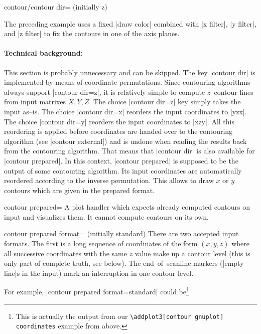 {{\begin{pgfplotskey}{contour/contour dir= (initially z)}
\begin{codeexample}[]
\begin{tikzpicture}
\begin{axis}[
	xlabel=$x$,ylabel=$y$,
	enlargelimits=false,
	3d box=complete]
\end{axis}
\end{tikzpicture}
\end{codeexample}
	\noindent The preceding example uses a fixed |draw color| combined with |x filter|, |y filter|, and |z filter| to fix the contours in one of the axis planes.

	\paragraph{Technical background:} This section is probably unnecessary and can be skipped. The key |contour dir| is implemented by means of coordinate permutations. Since contouring algorithms always support |contour dir=z|, it is relatively simple to compute $z$--contour lines from input matrixes $X, Y, Z$. The choice |contour dir=z| key simply takes the input as--is. The choice |contour dir=x| reorders the input coordinates to |yzx|. The choice |contour dir=y| reorders the input coordinates to |xzy|. All this reordering is applied before coordinates are handed over to the contouring algorithm (see |contour external|) and is undone when reading the results back from the contouring algorithm. That means that |contour dir| is also available for |contour prepared|. In this context, |contour prepared| is supposed to be the output of some contouring algorithm. Its input coordinates are automatically reordered according to the inverse permutation. This allows to draw $x$ or $y$ contours which are given in the prepared format.
\end{pgfplotskey}

\begin{plottype}[/pgfplots]{contour prepared=\textcolor{black}{}}
	A plot handler which expects already computed contours on input and visualizes them. It cannot compute contours on its own.

	\begin{pgfplotskey}{contour prepared format= (initially standard)}
	There are two accepted input formats. The first is a long sequence of coordinates of the form $(x,y,z)$ where all successive coordinates with the same $z$ value make up a contour level (this is only part of complete truth, see below). The end--of--scanline markers (|empty line|s in the input) mark an interruption in one contour level.

	For example, |contour prepared format=standard| could be\footnote{This is actually the output from our \texttt{\textbackslash addplot3[contour gnuplot] coordinates} example from above.}
\begin{codeexample}[]
\end{codeexample}
\end{pgfplotskey}
\end{plottype}}}
